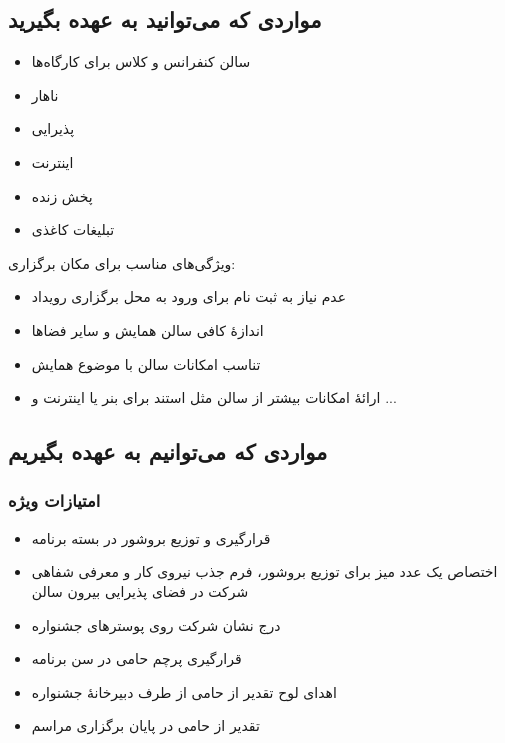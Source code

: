 \documentclass{article}
\begin{document}
\subsection{مواردی که می‌توانید به عهده بگیرید}


\begin{flushright}

\begin{itemize}
\item سالن کنفرانس و کلاس برای کارگاه‌ها
\item ناهار
\item پذیرایی
\item اینترنت
\item پخش زنده
\item تبلیغات کاغذی
\end{itemize}

\end{flushright}

\begin{flushright}

ویژگی‌های مناسب برای مکان برگزاری:

\begin{itemize}
\item عدم نیاز به ثبت نام برای ورود به محل برگزاری رویداد
\item اندازهٔ کافی سالن همایش و سایر فضاها
\item تناسب امکانات سالن با موضوع همایش
\item ارائهٔ امکانات بیشتر از سالن مثل استند برای بنر یا اینترنت و ... 
\end{itemize}

\end{flushright}

\subsection{مواردی که می‌توانیم به عهده بگیریم}

\subsubsection{امتیازات ویژه}

\begin{flushright}
\begin{itemize}
\item قرارگیری و توزیع بروشور در بسته برنامه
\item اختصاص یک عدد میز برای توزیع بروشور، فرم جذب نیروی کار و معرفی شفاهی شرکت در فضای پذیرایی بیرون سالن
\item درج نشان شرکت روی پوسترهای جشنواره
\item قرارگیری پرچم حامی در سن برنامه
\item اهدای لوح تقدیر از حامی از طرف دبیرخانهٔ جشنواره
\item تقدیر از حامی در پایان برگزاری مراسم
\end{itemize}
\end{flushright}
\end{document}
